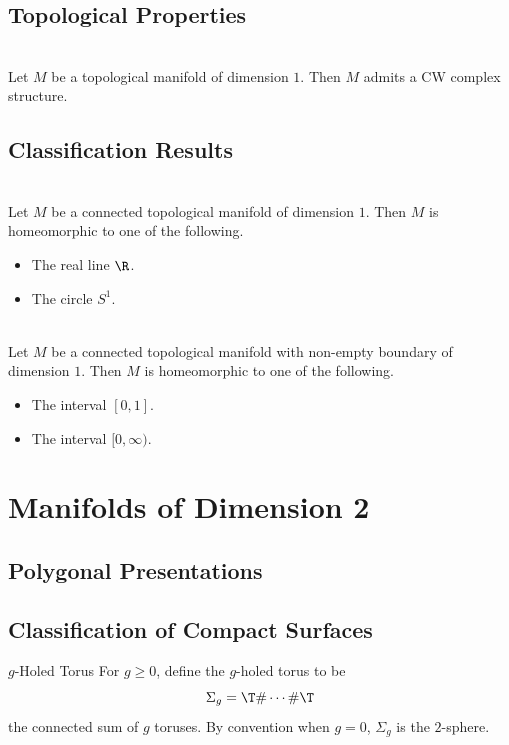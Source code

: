 \documentclass[a4paper]{article}
\begin{document}
\subsection{Topological Properties}
\begin{prp}{}{}\\
Let $M$ be a topological manifold of dimension $1$. Then $M$ admits a CW complex structure. 
\end{prp}

\subsection{Classification Results}
\begin{prp}{}{}\\
Let $M$ be a connected topological manifold of dimension $1$. Then $M$ is homeomorphic to one of the following. 
\begin{itemize}
\item The real line $\R$. 
\item The circle $S^1$. 
\end{itemize}
\end{prp}

\begin{prp}{}{}\\
Let $M$ be a connected topological manifold with non-empty boundary of dimension $1$. Then $M$ is homeomorphic to one of the following. 
\begin{itemize}
\item The interval $[0,1]$. 
\item The interval $[0,\infty)$. 
\end{itemize}
\end{prp}

\pagebreak
\section{Manifolds of Dimension 2}
\subsection{Polygonal Presentations}

\subsection{Classification of Compact Surfaces}
\begin{defn}{$g$-Holed Torus}{} For $g\geq 0$, define the $g$-holed torus to be $$\Sigma_g=\T\#\cdots\#\T$$ the connected sum of $g$ toruses. By convention when $g=0$, $\Sigma_g$ is the $2$-sphere. 
\end{defn}
\end{document}
